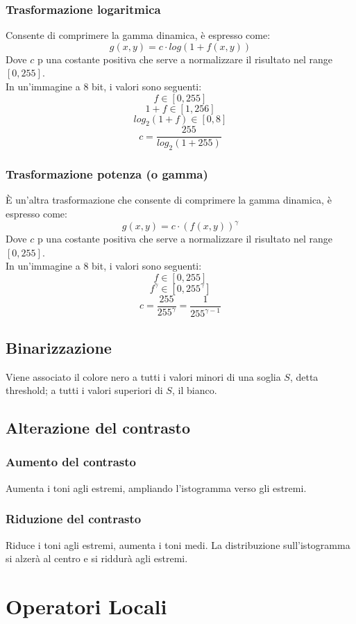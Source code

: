\documentclass{report}
\begin{document}
	\subsection{Trasformazione logaritmica}
	Consente di comprimere la gamma dinamica, è espresso come:
	$$
	g(x,y) = c\cdot log(1+f(x,y))
	$$
	Dove $c$ p una costante positiva che serve a normalizzare il risultato nel range $[0,255]$.\\
	In un'immagine a 8 bit, i valori sono seguenti:
	$$
	f \in [0,255]
	$$
	$$
	1+f \in [1,256]
	$$
	$$
	log_2(1+f) \in [0,8]
	$$
	$$
	c = \frac{255}{log_2(1+255)}
	$$
		
	\subsection{Trasformazione potenza (o gamma)}
	È un'altra trasformazione che consente di comprimere la gamma dinamica, è espresso come:
	$$
	g(x,y) = c\cdot(f(x,y))^\gamma
	$$
	Dove $c$ p una costante positiva che serve a normalizzare il risultato nel range $[0,255]$.\\
	In un'immagine a 8 bit, i valori sono seguenti:
	$$
	f \in [0,255]
	$$
	$$
	f^\gamma \in [0,255^\gamma]
	$$
	$$
	c = \frac{255}{255^\gamma} = \frac{1}{255^{\gamma-1}}
	$$
		
	\section{Binarizzazione}
	Viene associato il colore nero a tutti i valori minori di una soglia $S$, detta threshold; a tutti i valori superiori di $S$, il bianco.
	\section{Alterazione del contrasto}
	\subsection{Aumento del contrasto}
	Aumenta i toni agli estremi, ampliando l'istogramma verso gli estremi.
	\subsection{Riduzione del contrasto}
	Riduce i toni agli estremi, aumenta i toni medi.
	La distribuzione sull'istogramma si alzerà al centro e si riddurà agli estremi.
		
	\chapter{Operatori Locali}
\end{document}
